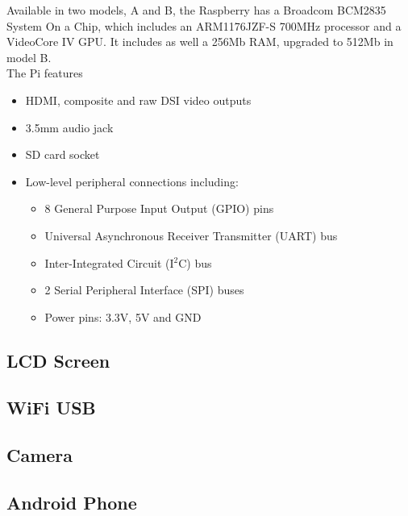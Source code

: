Available in two models, A and B, the Raspberry has a Broadcom BCM2835 System On a Chip, which includes an ARM1176JZF-S 700MHz processor and a VideoCore IV GPU. It includes as well a 256Mb RAM, upgraded to 512Mb in model B.\\
The Pi features 
	\begin{itemize}
		  
		  \item HDMI, composite and raw DSI video outputs
		  \item 3.5mm audio jack
		  \item SD card socket
		  \item Low-level peripheral connections including:
		  	\begin{itemize}
		  	\item 8 General Purpose Input Output (GPIO) pins
		  	\item Universal Asynchronous Receiver Transmitter (UART) bus
		  	\item Inter-Integrated Circuit (I$^2$C) bus
		  	\item 2 Serial Peripheral Interface (SPI) buses
		  	\item Power pins: 3.3V, 5V and GND
		  	\end{itemize}

	\end{itemize}



\subsection{LCD Screen}



\subsection{WiFi USB}



\subsection{Camera}



\subsection{Android Phone}



